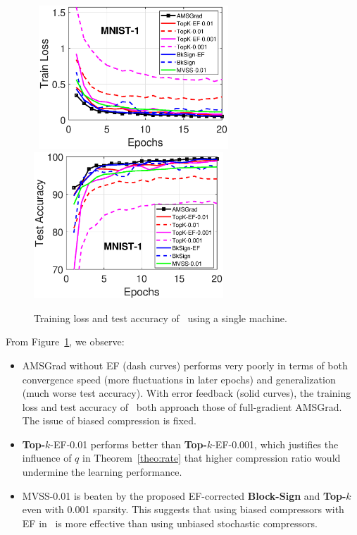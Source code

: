 \documentclass[11pt]{article}
\begin{document}
\begin{figure}
    \begin{center}
    \mbox{\hspace{-0.1in}
        \includegraphics[width=2.8in]{fig/mnist_cnn_train_loss_1_Qadamsign.eps}\hspace{-0.1in}
        \includegraphics[width=2.8in]{fig/mnist_cnn_test_accuracy_1_Qadamsign.eps}
    }
    \end{center}
	\caption{Training loss and test accuracy of \algo\ using a single machine.}
	\label{fig:mnist-1}
\end{figure}

From Figure~\ref{fig:mnist-1}, we observe:
\begin{itemize}
    \item AMSGrad without EF (dash curves) performs very poorly in terms of both convergence speed (more fluctuations in later epochs) and generalization (much worse test accuracy). With error feedback (solid curves), the training loss and test accuracy of \algo\ both approach those of full-gradient AMSGrad. The issue of biased compression is fixed.
    
    \item \textbf{Top-$k$}-EF-0.01 performs better than \textbf{Top-$k$}-EF-0.001, which justifies the influence of $q$ in Theorem~\ref{theo:rate} that higher compression ratio would undermine the learning performance.
    
    \item MVSS-0.01 is beaten by the proposed EF-corrected \textbf{Block-Sign} and \textbf{Top-$k$} even with 0.001 sparsity. This suggests that using biased compressors with EF in \algo\ is more effective than using unbiased stochastic compressors.
\end{itemize}
\end{document}
